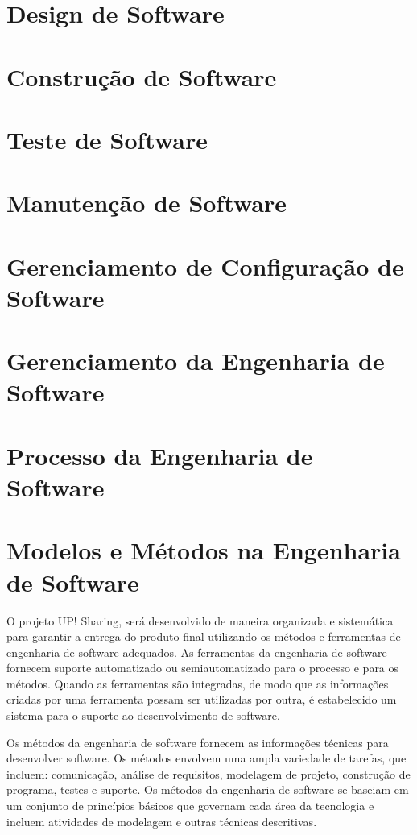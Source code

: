 \documentclass[12pt]{article}
\begin{document}
\section{Design de Software}
\section{Construção de Software}
\section{Teste de Software}
\section{Manutenção de Software}
\section{Gerenciamento de Configuração de Software}
\section{Gerenciamento da Engenharia de Software}
\section{Processo da Engenharia de Software}


\section{Modelos e Métodos na Engenharia de Software}

O projeto UP! Sharing, será desenvolvido de maneira organizada e sistemática para garantir a entrega do produto final utilizando os métodos e ferramentas de engenharia de software adequados. 
As ferramentas da engenharia de software fornecem suporte automatizado ou semiautomatizado para o processo e para os métodos. Quando as ferramentas são integradas, de modo que as informações criadas por uma ferramenta possam ser utilizadas por outra, é estabelecido um sistema para o suporte ao desenvolvimento de software.
\cite{pressman2016engenharia}

Os métodos da engenharia de software fornecem as informações técnicas para desenvolver software. Os métodos envolvem uma ampla variedade de tarefas, que incluem: comunicação, análise de requisitos, modelagem de projeto, construção de programa, testes e suporte. Os métodos da engenharia de software se baseiam em um conjunto de princípios básicos que governam cada área da tecnologia e incluem atividades de modelagem e outras técnicas descritivas.
\end{document}
